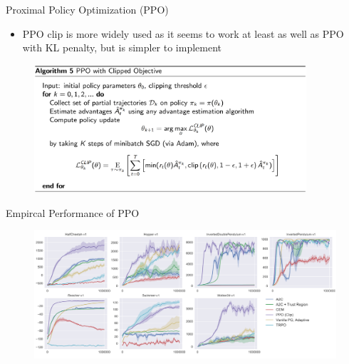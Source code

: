 \begin{frame}{Proximal Policy Optimization (PPO)}
\begin{itemize}
    \item PPO clip is more widely used as it seems to work at least as well as PPO with KL penalty, but is simpler to implement
\end{itemize}
\begin{figure}
\centering
\includegraphics[width=0.9\textwidth,height=0.8\textheight,keepaspectratio]{images/policy-search/ppo_2.png}
\end{figure}
    
\end{frame}

\begin{frame}{Empircal Performance of PPO}
\begin{figure}
\centering
\includegraphics[width=1.0\textwidth,height=1.0\textheight,keepaspectratio]{images/policy-search/ppo_3.png}
\end{figure}


\end{frame}
